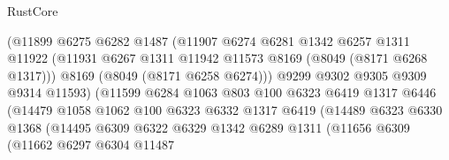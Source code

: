 \begin{lexlean}{RustCore}
\begin{coremodule}
                                (@11899
                                  @6275
                                  @6282
                                  @1487
                                  (@11907
                                    @6274
                                    @6281
                                    @1342
                                    @6257
                                    @1311
                                    @11922
                                    (@11931
                                      @6267
                                      @1311
                                      @11942
                                      @11573
                                      @8169
                                      (@8049 (@8171 @6268 @1317)))
                                    @8169
                                    (@8049 (@8171 @6258 @6274)))
                                  @9299
                                  @9302
                                  @9305
                                  @9309
                                  @9314
                                  @11593)
                                (@11599
                                  @6284
                                  @1063
                                  @803
                                  @100
                                  @6323
                                  @6419
                                  @1317
                                  @6446
                                  (@14479
                                    @1058
                                    @1062
                                    @100
                                    @6323
                                    @6332
                                    @1317
                                    @6419
                                    (@14489
                                      @6323
                                      @6330
                                      @1368
                                      (@14495
                                        @6309
                                        @6322
                                        @6329
                                        @1342
                                        @6289
                                        @1311
                                        (@11656
                                          @6309
                                          (@11662
                                            @6297
                                            @6304
                                            @11487

\end{coremodule}
\end{lexlean}
